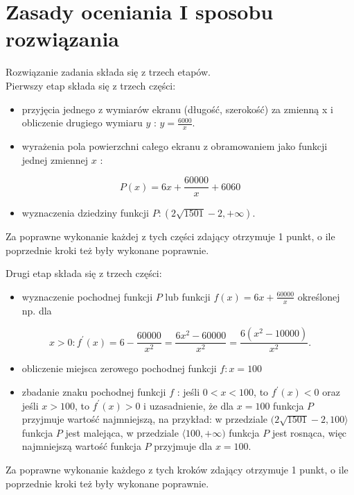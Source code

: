 \documentclass[10pt]{article}
\begin{document}
\section*{Zasady oceniania I sposobu rozwiązania}
Rozwiązanie zadania składa się z trzech etapów.\\
Pierwszy etap składa się z trzech części:

\begin{itemize}
  \item przyjęcia jednego z wymiarów ekranu (długość, szerokość) za zmienną x i obliczenie drugiego wymiaru $y$ : $y=\frac{6000}{x}$.
  \item wyrażenia pola powierzchni całego ekranu z obramowaniem jako funkcji jednej zmiennej $x$ :
\end{itemize}

$$
P(x)=6 x+\frac{60000}{x}+6060
$$

\begin{itemize}
  \item wyznaczenia dziedziny funkcji $P:(2 \sqrt{1501}-2,+\infty)$.
\end{itemize}

Za poprawne wykonanie każdej z tych części zdający otrzymuje 1 punkt, o ile poprzednie kroki też były wykonane poprawnie.

Drugi etap składa się z trzech części:

\begin{itemize}
  \item wyznaczenie pochodnej funkcji $P$ lub funkcji $f(x)=6 x+\frac{60000}{x}$ określonej np. dla
\end{itemize}

$$
x>0: f^{\prime}(x)=6-\frac{60000}{x^{2}}=\frac{6 x^{2}-60000}{x^{2}}=\frac{6\left(x^{2}-10000\right)}{x^{2}} .
$$

\begin{itemize}
  \item obliczenie miejsca zerowego pochodnej funkcji $f: x=100$
  \item zbadanie znaku pochodnej funkcji $f$ : jeśli $0<x<100$, to $f^{\prime}(x)<0$ oraz jeśli $x>100$, to $f^{\prime}(x)>0$ i uzasadnienie, że dla $x=100$ funkcja $P$ przyjmuje wartość najmniejszą, na przykład: w przedziale $(2 \sqrt{1501}-2,100\rangle$ funkcja $P$ jest malejąca, w przedziale $\langle 100,+\infty)$ funkcja $P$ jest rosnąca, więc najmniejszą wartość funkcja $P$ przyjmuje dla $x=100$.
\end{itemize}

Za poprawne wykonanie każdego z tych kroków zdający otrzymuje 1 punkt, o ile poprzednie kroki też były wykonane poprawnie.
\end{document}
